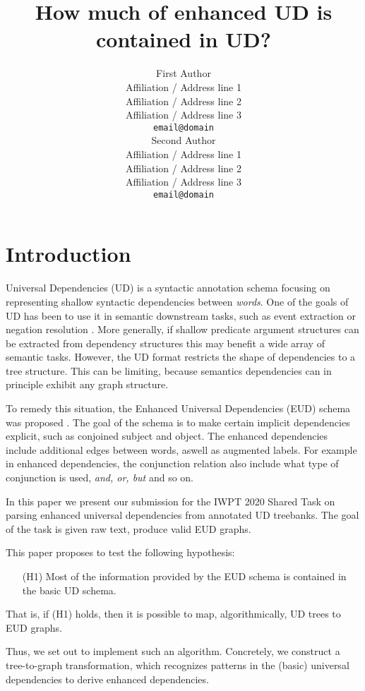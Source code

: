 \documentclass[11pt,a4paper]{article}
\title{How much of enhanced UD is contained in UD?}
\author{First Author \\
  Affiliation / Address line 1 \\
  Affiliation / Address line 2 \\
  Affiliation / Address line 3 \\
  \texttt{email@domain} \\\And
  Second Author \\
  Affiliation / Address line 1 \\
  Affiliation / Address line 2 \\
  Affiliation / Address line 3 \\
  \texttt{email@domain} \\}
\date{}
\begin{document}
\maketitle
\begin{abstract}
\end{abstract}

\section{Introduction}
Universal Dependencies (UD) is a syntactic annotation schema
focusing on representing shallow syntactic dependencies between
\emph{words}. One of the goals of UD has been to use it in
semantic downstream tasks, such as event extraction
\citep{fares20182018, mcclosky2011event} or negation resolution
\citep{fares20182018}. More generally, if shallow predicate
argument structures can be extracted from dependency structures
this may benefit a wide array of semantic tasks.
%
However, the UD format restricts the shape of dependencies to a tree
structure.  This can be limiting, because semantics dependencies can
in principle exhibit any graph structure.

To remedy this situation, the Enhanced Universal Dependencies
(EUD) schema was proposed \citep{schuster2016enhanced}. The goal
of the schema is to make certain implicit dependencies explicit,
such as conjoined subject and object. The enhanced dependencies
include additional edges between words, aswell as augmented
labels. For example in enhanced dependencies, the conjunction
relation also include what type of conjunction is used,
\textit{and, or, but} and so on.

In this paper we present our submission for the IWPT 2020 Shared
Task on parsing enhanced universal dependencies from annotated UD
treebanks. The goal of the task is given raw text, produce valid
EUD graphs.

This paper proposes to test the following hypothesis:
\begin{enumerate}
\item[(H1)] Most of the information provided by the EUD schema is
  contained in the basic UD schema.
\end{enumerate}

That is, if (H1) holds, then it is possible to map, algorithmically,
UD trees to EUD graphs.

Thus, we set out to implement such an algorithm. Concretely, we construct  a
tree-to-graph transformation, which recognizes patterns in the (basic)
universal dependencies to derive enhanced dependencies.
\end{document}

